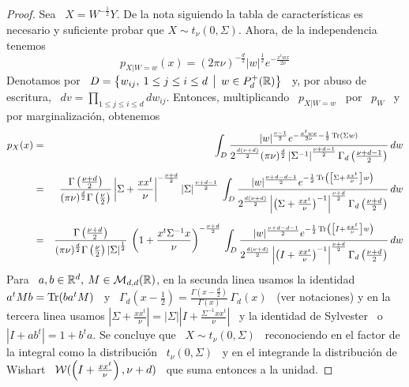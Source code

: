 \begin{proof}
  Sea \ $X = W^{-\frac12} Y$. De la nota siguiendo la tabla de caracter\'isticas
  es  necesario  y suficiente  probar  que $X  \sim  t_\nu(0,\Sigma)$.  Ahora, de  la
  independencia tenemos
  \[
  p_{X|W=w}(x)  = (2  \pi \nu)^{-\frac{d}{2}}  |w|^{\frac12} e^{-  \frac{x^t w  x}{2
      \nu}}
  \]
  Denotamos  por \  $D =  \left\{ w_{ij},  \: 1  \le j  \le i  \le d  \:\: \big| \:\:  w \in
    P_d^+(\mathbb{R}) \right\}$ \ y, por abuso de  escritura, \ $dv = \prod_{ 1 \le j
    \le i \le d} dw_{ij}$.  Entonces,  multiplicando \ $p_{X|W=w}$ \ por \ $p_W$
  \ y por marginalizaci\'on, obtenemos
  \begin{eqnarray*}
  p_X(x) & = & \int_D \frac{|w|^{\frac{\nu-1}{2}} e^{- \frac{x^t w x}{2 \nu} -
  \frac12 \operatorname{Tr}\left( \Sigma w \right)}}{2^{\frac{d (\nu+d)}{2}} (\pi
  \nu)^{\frac{d}{2}} \left| \Sigma^{-1} \right|^{\frac{\nu+d-1}{2}} \Gamma_d \left(
  \frac{\nu+d-1}{2} \right)} \, dw\\[2mm]
  & = & \frac{\Gamma\left( \frac{\nu+d}{2} \right)}{(\pi \nu)^{\frac{d}{2}}
  \Gamma\left( \frac{\nu}{2} \right)} \left| \Sigma + \frac{x x^t}{\nu}
  \right|^{-\frac{\nu+d}{2}} \left| \Sigma
  \right|^{\frac{\nu+d-1}{2}} \: \int_D \frac{|w|^{\frac{\nu+d-d-1}{2}} e^{-
  \frac12 \operatorname{Tr}\left( \left[ \Sigma + \frac{x x^t}{\nu} \right] w \right)}}{2^{\frac{d
  (\nu+d)}{2}} \left| \left( \Sigma + \frac{x x^t}{\nu} \right)^{-1}
  \right|^{\frac{\nu+d}{2}} \Gamma_d \left( \frac{\nu+d}{2} \right)} \, dw\\[2mm]
  & = & \frac{\Gamma\left( \frac{\nu+d}{2} \right)}{(\pi \nu)^{\frac{d}{2}}
  \Gamma\left( \frac{\nu}{2} \right) \left| \Sigma \right|^{\frac12}} \: \left( 1
  + \frac{x^t \Sigma^{-1} x}{\nu} \right)^{-\frac{\nu+d}{2}} \, \int_D
  \frac{|w|^{\frac{\nu+d-d-1}{2}} e^{- \frac12 \operatorname{Tr}\left( \left[ I + \frac{x
  x^t}{\nu} \right] w \right)}}{2^{\frac{d (\nu+d)}{2}} \left| \left( I + \frac{x
  x^t}{\nu} \right)^{-1} \right|^{\frac{\nu+d}{2}} \Gamma_d \left( \frac{\nu+d}{2}
  \right)} \, dw
  \end{eqnarray*}
  Para  \ $a, b  \in \mathbb{R}^d,  \: M  \in \mathcal{M}_{d,d}(\mathbb{R})$,  en la  secunda linea
  usamos la  identidad \  $a^t M b  = \operatorname{Tr}(b a^t  M)$ \  y \ $\Gamma_d\left(  x -
    \frac12 \right) = \frac{\Gamma\left(  x - \frac{d}{2} \right)}{\Gamma(x)} \,
  \Gamma_d(x)$ \ (ver notaciones) y en  la tercera linea usamos $\left| \Sigma +
    \frac{x   x^t}{\nu}   \right|  =   \left|   \Sigma   \right|   \left|  I   +
    \frac{\Sigma^{-1}   x    x^t}{\nu}   \right|$   \   y    la   identidad   de
  Sylvester~\cite{Syl51} o~\cite[\S~18.1]{Har08} \ $\left| I + a b^t \right| = 1
  + b^t  a$. Se  concluye que \  $X \sim  t_\nu(0,\Sigma)$ \ reconociendo  en el
  factor de  la integral como  la distribuci\'on \  $t_\nu(0,\Sigma)$ \ y  en el
  integrande la  distribuci\'on de Wishart \  $\mathcal{W}( \left( I  + \frac{x x^t}{\nu}
  \right),\nu+d)$ \ que suma entonces a la unidad.
\end{proof}


